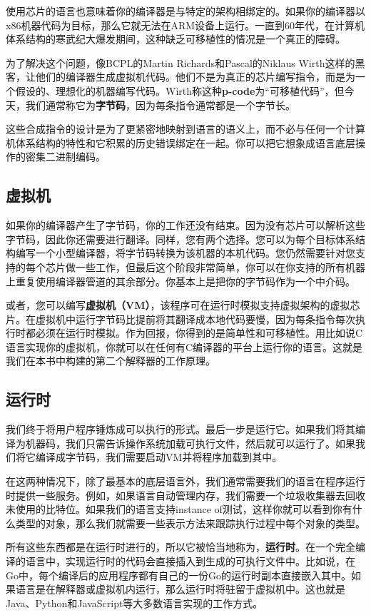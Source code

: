 \documentclass[cn,11pt,chinese]{elegantbook}
\begin{document}
使用芯片的语言也意味着你的编译器是与特定的架构相绑定的。如果你的编译器以x86机器代码为目标，那么它就无法在ARM设备上运行。一直到60年代，在计算机体系结构的寒武纪大爆发期间，这种缺乏可移植性的情况是一个真正的障碍。

为了解决这个问题，像BCPL的Martin Richards和Pascal的Niklaus Wirth这样的黑客，让他们的编译器生成虚拟机代码。他们不是为真正的芯片编写指令，而是为一个假设的、理想化的机器编写代码。Wirth称这种\textbf{p-code}为“可移植代码”，但今天，我们通常称它为\textbf{字节码}，因为每条指令通常都是一个字节长。

这些合成指令的设计是为了更紧密地映射到语言的语义上，而不必与任何一个计算机体系结构的特性和它积累的历史错误绑定在一起。你可以把它想象成语言底层操作的密集二进制编码。

\subsection{虚拟机}

如果你的编译器产生了字节码，你的工作还没有结束。因为没有芯片可以解析这些字节码，因此你还需要进行翻译。同样，您有两个选择。您可以为每个目标体系结构编写一个小型编译器，将字节码转换为该机器的本机代码。您仍然需要针对您支持的每个芯片做一些工作，但最后这个阶段非常简单，你可以在你支持的所有机器上重复使用编译器管道的其余部分。你基本上是把你的字节码作为一个中介码。

或者，您可以编写\textbf{虚拟机（VM）}，该程序可在运行时模拟支持虚拟架构的虚拟芯片。在虚拟机中运行字节码比提前将其翻译成本地代码要慢，因为每条指令每次执行时都必须在运行时模拟。作为回报，你得到的是简单性和可移植性。用比如说C语言实现你的虚拟机，你就可以在任何有C编译器的平台上运行你的语言。这就是我们在本书中构建的第二个解释器的工作原理。

\subsection{运行时}

我们终于将用户程序锤炼成可以执行的形式。最后一步是运行它。如果我们将其编译为机器码，我们只需告诉操作系统加载可执行文件，然后就可以运行了。如果我们将它编译成字节码，我们需要启动VM并将程序加载到其中。

在这两种情况下，除了最基本的底层语言外，我们通常需要我们的语言在程序运行时提供一些服务。例如，如果语言自动管理内存，我们需要一个垃圾收集器去回收未使用的比特位。如果我们的语言支持instance of测试，这样你就可以看到你有什么类型的对象，那么我们就需要一些表示方法来跟踪执行过程中每个对象的类型。

所有这些东西都是在运行时进行的，所以它被恰当地称为，\textbf{运行时}。在一个完全编译的语言中，实现运行时的代码会直接插入到生成的可执行文件中。比如说，在Go中，每个编译后的应用程序都有自己的一份Go的运行时副本直接嵌入其中。如果语言是在解释器或虚拟机内运行，那么运行时将驻留于虚拟机中。这也就是Java、Python和JavaScript等大多数语言实现的工作方式。
\end{document}
